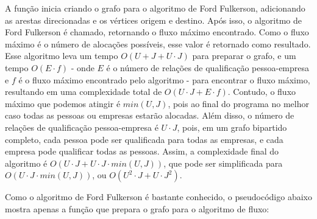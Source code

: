 \documentclass[12pt]{article}
\begin{document}
		\par A função inicia criando o grafo para o algoritmo de Ford Fulkerson, adicionando as arestas direcionadas e os vértices origem e destino. Após isso, o algoritmo de Ford Fulkerson é chamado, retornando o fluxo máximo encontrado. Como o fluxo máximo é o número de alocações possíveis, esse valor é retornado como resultado. Esse algoritmo leva um tempo $O(U + J + U \cdot J)$ para preparar o grafo, e um tempo $O(E \cdot f)$ - onde $E$ é o número de relações de qualificação pessoa-empresa e $f$ é o fluxo máximo encontrado pelo algoritmo - para encontrar o fluxo máximo, resultando em uma complexidade total de $O(U \cdot J + E \cdot f)$. Contudo, o fluxo máximo que podemos atingir é $min(U, J)$, pois ao final do programa no melhor caso todas as pessoas ou empresas estarão alocadas. Além disso, o número de relações de qualificação pessoa-empresa é $U \cdot J$, pois, em um grafo bipartido completo, cada pessoa pode ser qualificada para todas as empresas, e cada empresa pode qualificar todas as pessoas. Assim, a complexidade final do algoritmo é $O(U \cdot J + U \cdot J \cdot min(U, J))$, que pode ser simplificada para $O(U \cdot J \cdot min(U, J))$, ou $O(U^2 \cdot J + U \cdot J^2)$.

		\par Como o algoritmo de Ford Fulkerson é bastante conhecido, o pseudocódigo abaixo mostra apenas a função que prepara o grafo para o algoritmo de fluxo:
		
\end{document}
